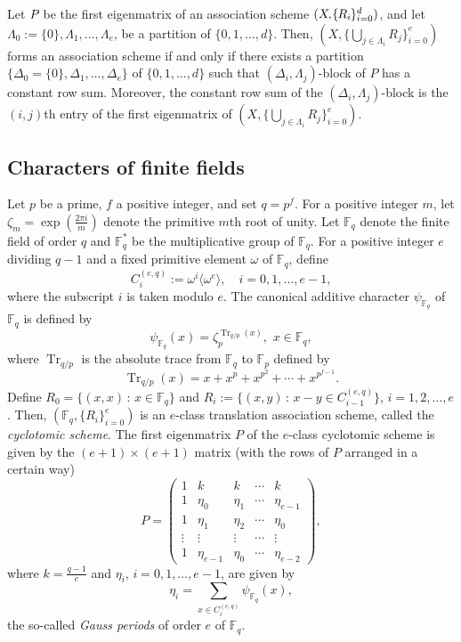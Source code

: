 \documentclass[ALCO,ThmDefs,Unicode]{cedram}
\DeclareMathOperator{\Tr}{Tr}
\newcommand*\F{{\mathbb F}}
\newcommand*{\mk}{\mkern -1mu}
\newcommand*{\Mk}{\mkern -2mu}
\begin{document}
\begin{prop}\label{prop:BM}
Let $P\Mk$ be the first eigenmatrix of an association scheme $(X\Mk,\Mk\{\mk R_i\mk \}_{i=0}^d)$, and let $\Lambda_0:=\{0\}, \Lambda_1,\ldots,\Lambda_e$, be a partition of $\{0,1,\ldots,d\}$. Then, $(X,\{\bigcup_{j\in \Lambda_i}R_j\}_{i=0}^e)$ forms an association scheme if and only if there exists a partition $\{\Delta_0=\{0\},\Delta_1,\ldots,\Delta_e\}$ of $\{0,1,\ldots,d\}$ such that $(\Delta_i,\Lambda_j)$-block of $P$ has a constant row sum. Moreover, the constant row sum of the $(\Delta_i,\Lambda_j)$-block is the $(i,j)$th entry of the first eigenmatrix of $(X,\{\bigcup_{j\in \Lambda_i}R_j\}_{i=0}^e)$.
\end{prop}

\subsection{Characters of finite fields}\label{sec:31}
Let $p$ be a prime, $f$ a positive integer, and set $q=p^f$. For a positive integer $m$, let $\zeta_m=\exp(\frac{2\pi i}{m})$ denote the primitive $m$th root of unity. Let $\F_q$ denote the finite field of order $q$ and $\F_q^\ast$ be the multiplicative group of $\F_q$. For a positive integer $e$ dividing $q-1$ and a fixed primitive element $\omega$ of $\F_q$, define
\[
C_i^{(e,q)}:=\omega^i\langle \omega^e\rangle, \quad i=0,1,\ldots,e-1,
\]
where the subscript $i$ is taken modulo $e$. The canonical additive character $\psi_{\F_q}$ of $\F_q$ is defined by
\[
\psi_{\F_q}(x)=\zeta_p^{\Tr_{q/p}(x)}, \, \, x\in \F_q,
\]
where $\Tr_{q/p}$ is the absolute trace from $\F_q$ to $\F_p$ defined by
\[
\Tr_{q/p}(x)=x+x^p+x^{p^2}+\cdots+x^{p^{f-1}}.
\]
Define $R_0=\{(x,x)\,:\,x\in \F_q\}$ and $R_i:=\{(x,y)\,:\,x-y \in C_{i-1}^{(e,q)}\}$, $i=1,2,\ldots,e$. Then, $(\F_{q},\{R_i\}_{i=0}^e)$ is an $e$-class translation association scheme, called the \emph{cyclotomic scheme}. The first eigenmatrix $P$ of the $e$-class cyclotomic scheme is given by the $(e+1)\times (e+1)$ matrix (with the rows of $P$ arranged in a certain way)
\[
P=
\begin{pmatrix}
1 &k & k& \cdots &k \\
1 & \eta_0 & \eta_1&\cdots &\eta_{e-1} \\
1 & \eta_1 & \eta_2&\cdots &\eta_{0} \\
\vdots &\vdots &\vdots & \cdots & \vdots \\
1 & \eta_{e-1} & \eta_0&\cdots &\eta_{e-2}
\end{pmatrix},
\]
where $k=\frac{q-1}{e}$ and $\eta_i$, $i=0,1,\ldots,e-1$, are given by
\[
\eta_i=\sum_{x\in C_i^{(e,q)}}\psi_{\F_q}(x),
\]
the so-called \emph{Gauss periods} of order $e$ of $\F_q$.
\end{document}
